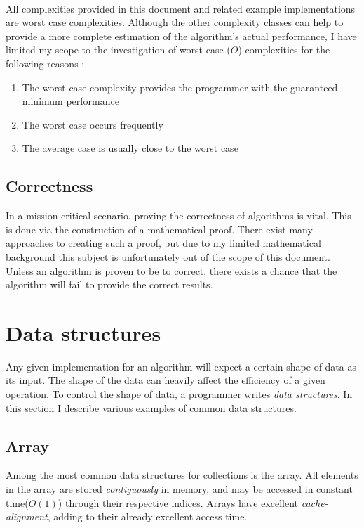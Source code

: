 \documentclass{article}
\begin{document}
{\paragraph{}
All complexities provided in this document and related example implementations are worst case complexities. Although the other
complexity classes can help to provide a more complete estimation of the algorithm's actual performance, I have limited my
scope to the investigation of worst case (\(O\)) complexities for the following reasons
\cite[p.27-28]{introduction-to-algorithms}:
\begin{enumerate}
\item{The worst case complexity provides the programmer with the guaranteed minimum performance}
\item{The worst case occurs frequently}
\item{The average case is usually close to the worst case}
\end{enumerate}

\subsection{Correctness}
In a mission-critical scenario, proving the correctness of algorithms is vital. This is done via the construction of a
mathematical proof. There exist many approaches to creating such a proof, but due to my limited mathematical background
this subject is unfortunately out of the scope of this document. Unless an algorithm is proven to be to correct, there
exists a chance that the algorithm will fail to provide the correct results.


\newpage


\section{Data structures}
Any given implementation for an algorithm will expect a certain shape of data as its input. The shape of the data
can heavily affect the efficiency of a given operation. To control the shape of data, a programmer writes {\em data
structures}. In this section I describe various examples of common data structures.


\subsection{Array}
Among the most common data structures for collections is the array. All elements in the array are stored
{\em contiguously} in memory, and may be accessed in constant time(\(O(1)\)) through their respective indices.
Arrays have excellent {\em cache-alignment}, adding to their already excellent access time.

}
\end{document}
